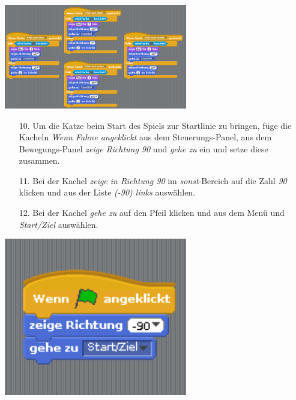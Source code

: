 \includegraphics[width=0.6\textwidth]{images/aufgabe4_katze_alle_richtungen.png}
\begin{itemize}
\item[10. ] Um die Katze beim Start des Spiels zur Startlinie zu bringen, f{\"u}ge die Kacheln \textit{Wenn Fahne angeklickt} aus dem Steuerungs-Panel, aus dem Bewegungs-Panel \textit{zeige Richtung 90} und \textit{gehe zu} ein und setze diese zusammen.
\item[11. ] Bei der Kachel \textit{zeige in Richtung 90} im \textit{sonst}-Bereich auf die Zahl \textit{90} klicken und aus der Liste \textit{(-90) links} ausw{\"a}hlen.
\item[12. ] Bei der Kachel \textit{gehe zu} auf den Pfeil klicken und aus dem Men{\"u} und \textit{Start/Ziel} ausw{\"a}hlen.
\end{itemize}
\includegraphics[width=0.6\textwidth]{images/aufgabe4_katze_an_start_stop.png}


